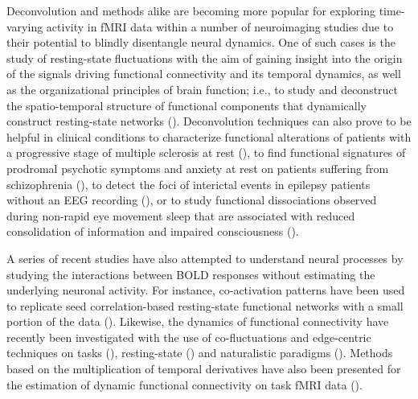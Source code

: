 Deconvolution and methods alike are becoming more popular for exploring time-varying activity in fMRI data within a number of neuroimaging studies due to their potential to blindly disentangle neural dynamics. One of such cases is the study of resting-state fluctuations with the aim of gaining insight into the origin of the signals driving functional connectivity and its temporal dynamics, as well as the organizational principles of brain function; i.e., to study and deconstruct the spatio-temporal structure of functional components that dynamically construct resting-state networks (\citealt{petridou2013PeriodsRestFMRI,karahanoglu2015TransientBrainActivity,karahanoglu2017DynamicsLargescaleFMRI,kinany2020DynamicFunctionalConnectivity, gonzalez-castillo2019ImagingSpontaneousFlow,allan2015FunctionalConnectivityMRI}). Deconvolution techniques can also prove to be helpful in clinical conditions to characterize functional alterations of patients with a progressive stage of multiple sclerosis at rest (\citealt{bommarito2020FunctionalNetworkDynamicsa}), to find functional signatures of prodromal psychotic symptoms and anxiety at rest on patients suffering from schizophrenia (\citealt{zoller2019LargeScaleBrainNetwork}), to detect the foci of interictal events in epilepsy patients without an EEG recording (\citealt{lopes2012DetectionEpilepticActivity}), or to study functional dissociations observed during non-rapid eye movement sleep that are associated with reduced consolidation of information and impaired consciousness (\citealt{tarun2021NREMSleepStagesa}).

A series of recent studies have also attempted to understand neural processes by studying the interactions between BOLD responses without estimating the underlying neuronal activity. For instance, co-activation patterns have been used to replicate seed correlation-based resting-state functional networks with a small portion of the data (\citealt{liu2013time,liu2013decomposition,liu2018co,majeed2009spatiotemporal,majeed2011spatiotemporal,cifre2020revisiting,cifre2020further,zhang2020relationship}). Likewise, the dynamics of functional connectivity have recently been investigated with the use of co-fluctuations and edge-centric techniques on tasks (\citealt{faskowitz2021EdgecentricModelHarmonizing}), resting-state (\citealt{zamaniesfahlani2020HighamplitudeCofluctuationsCortical}) and naturalistic paradigms (\citealt{faskowitz2020EdgecentricFunctionalNetwork,betzel2020TemporalFluctuationsBrain}). Methods based on the multiplication of temporal derivatives have also been presented for the estimation of dynamic functional connectivity on task fMRI data (\citealt{shine2015estimation,shine2016dynamics}).

